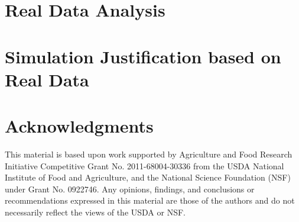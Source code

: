 \documentclass[11pt]{article}
\begin{document}
\section{Real Data Analysis}

\section{Simulation Justification based on Real Data}

\section*{Acknowledgments}
This material is based upon work supported by Agriculture and Food
Research Initiative Competitive Grant No. 2011-68004-30336 from
the USDA National Institute of Food and Agriculture, and the
National Science Foundation (NSF) under Grant No. 0922746.
Any opinions, findings, and conclusions or recommendations expressed
in this material are those of the authors and do not necessarily reflect
the views of the USDA or NSF.


\begin{bibliography}{99}
\end{bibliography}
\end{document}
